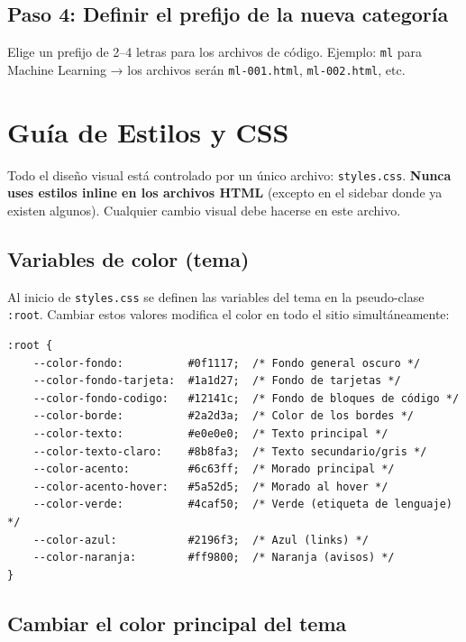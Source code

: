 \documentclass[12pt, a4paper]{article}
\newcommand{\archivo}[1]{\texttt{\textcolor{cpAccent}{#1}}}
\begin{document}
\subsection{Paso 4: Definir el prefijo de la nueva categoría}

Elige un prefijo de 2--4 letras para los archivos de código. Ejemplo:
\texttt{ml} para Machine Learning → los archivos serán \archivo{ml-001.html},
\archivo{ml-002.html}, etc.


\section{Guía de Estilos y CSS}

Todo el diseño visual está controlado por un único archivo: \archivo{styles.css}.
\textbf{Nunca uses estilos inline en los archivos HTML} (excepto en el sidebar
donde ya existen algunos). Cualquier cambio visual debe hacerse en este archivo.

\subsection{Variables de color (tema)}

Al inicio de \archivo{styles.css} se definen las variables del tema en
la pseudo-clase \texttt{:root}. Cambiar estos valores modifica el color
en todo el sitio simultáneamente:

\begin{lstlisting}[style=cssInline, caption={Variables de color en styles.css}]
:root {
    --color-fondo:          #0f1117;  /* Fondo general oscuro */
    --color-fondo-tarjeta:  #1a1d27;  /* Fondo de tarjetas */
    --color-fondo-codigo:   #12141c;  /* Fondo de bloques de código */
    --color-borde:          #2a2d3a;  /* Color de los bordes */
    --color-texto:          #e0e0e0;  /* Texto principal */
    --color-texto-claro:    #8b8fa3;  /* Texto secundario/gris */
    --color-acento:         #6c63ff;  /* Morado principal */
    --color-acento-hover:   #5a52d5;  /* Morado al hover */
    --color-verde:          #4caf50;  /* Verde (etiqueta de lenguaje) */
    --color-azul:           #2196f3;  /* Azul (links) */
    --color-naranja:        #ff9800;  /* Naranja (avisos) */
}
\end{lstlisting}

\subsection{Cambiar el color principal del tema}
\end{document}
